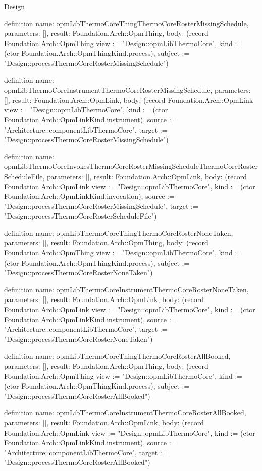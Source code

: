 \begin{lexlean}{Design}
\begin{semanticmodule}
definition{
  name: opmLibThermoCoreThingThermoCoreRosterMissingSchedule,
  parameters: [],
  result: Foundation.Arch::OpmThing,
  body: (record Foundation.Arch::OpmThing {view := "Design::opmLibThermoCore", kind := (ctor Foundation.Arch::OpmThingKind.process), subject := "Design::processThermoCoreRosterMissingSchedule"})
}

definition{
  name: opmLibThermoCoreInstrumentThermoCoreRosterMissingSchedule,
  parameters: [],
  result: Foundation.Arch::OpmLink,
  body: (record Foundation.Arch::OpmLink {view := "Design::opmLibThermoCore", kind := (ctor Foundation.Arch::OpmLinkKind.instrument), source := "Architecture::componentLibThermoCore", target := "Design::processThermoCoreRosterMissingSchedule"})
}

definition{
  name: opmLibThermoCoreInvokesThermoCoreRosterMissingScheduleThermoCoreRosterScheduleFile,
  parameters: [],
  result: Foundation.Arch::OpmLink,
  body: (record Foundation.Arch::OpmLink {view := "Design::opmLibThermoCore", kind := (ctor Foundation.Arch::OpmLinkKind.invocation), source := "Design::processThermoCoreRosterMissingSchedule", target := "Design::processThermoCoreRosterScheduleFile"})
}

definition{
  name: opmLibThermoCoreThingThermoCoreRosterNoneTaken,
  parameters: [],
  result: Foundation.Arch::OpmThing,
  body: (record Foundation.Arch::OpmThing {view := "Design::opmLibThermoCore", kind := (ctor Foundation.Arch::OpmThingKind.process), subject := "Design::processThermoCoreRosterNoneTaken"})
}

definition{
  name: opmLibThermoCoreInstrumentThermoCoreRosterNoneTaken,
  parameters: [],
  result: Foundation.Arch::OpmLink,
  body: (record Foundation.Arch::OpmLink {view := "Design::opmLibThermoCore", kind := (ctor Foundation.Arch::OpmLinkKind.instrument), source := "Architecture::componentLibThermoCore", target := "Design::processThermoCoreRosterNoneTaken"})
}

definition{
  name: opmLibThermoCoreThingThermoCoreRosterAllBooked,
  parameters: [],
  result: Foundation.Arch::OpmThing,
  body: (record Foundation.Arch::OpmThing {view := "Design::opmLibThermoCore", kind := (ctor Foundation.Arch::OpmThingKind.process), subject := "Design::processThermoCoreRosterAllBooked"})
}

definition{
  name: opmLibThermoCoreInstrumentThermoCoreRosterAllBooked,
  parameters: [],
  result: Foundation.Arch::OpmLink,
  body: (record Foundation.Arch::OpmLink {view := "Design::opmLibThermoCore", kind := (ctor Foundation.Arch::OpmLinkKind.instrument), source := "Architecture::componentLibThermoCore", target := "Design::processThermoCoreRosterAllBooked"})
}


\end{semanticmodule}
\end{lexlean}
